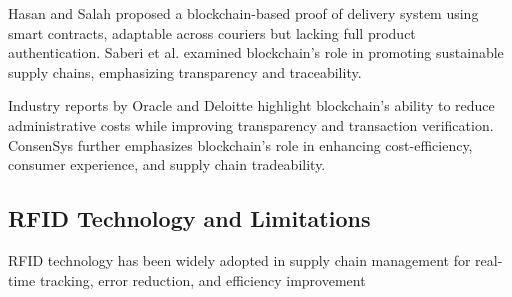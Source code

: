 \documentclass[conference]{IEEEtran}
\begin{document}
Hasan and Salah \cite{hasan2018proof} proposed a blockchain-based proof of delivery system using smart contracts, adaptable across couriers but lacking full product authentication. Saberi et al. \cite{saberi2019blockchain} examined blockchain’s role in promoting sustainable supply chains, emphasizing transparency and traceability.

Industry reports by Oracle \cite{oracle2024blockchain} and Deloitte \cite{deloitte2023using} highlight blockchain’s ability to reduce administrative costs while improving transparency and transaction verification. ConsenSys \cite{consensys2024blockchain} further emphasizes blockchain’s role in enhancing cost-efficiency, consumer experience, and supply chain tradeability.

\subsection{RFID Technology and Limitations}
RFID technology has been widely adopted in supply chain management for real-time tracking, error reduction, and efficiency improvement 
\end{document}
